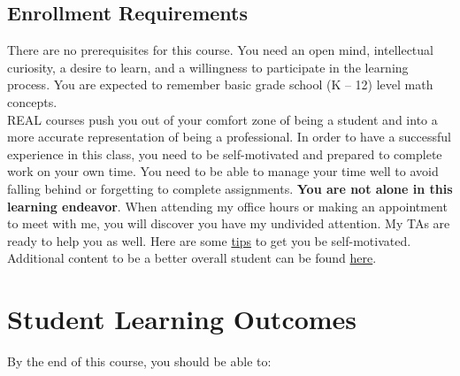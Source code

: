 \documentclass[11pt]{paper}
\begin{document}
\subsection{Enrollment Requirements}
There are no prerequisites for this course.  You need an open mind, intellectual curiosity, a desire to learn, and a willingness to participate in the learning process.  You are expected to remember basic grade school (K – 12) level math concepts.\\

REAL courses push you out of your comfort zone of being a student and into a more accurate representation of being a professional. In order to have a successful experience in this class, you need to be self-motivated and prepared to complete work on your own time. You need to be able to manage your time well to avoid falling behind or forgetting to complete assignments. \textbf{You are not alone in this learning endeavor}. When attending my office hours or making an appointment to meet with me, you will discover you have my undivided attention. My TAs are ready to help you as well. Here are some \href{https://learningcenter.unc.edu/tips-and-tools/motivation/}{tips} to get you be self-motivated. Additional content to be a better overall student can be found \href{https://learningcenter.unc.edu/tips-and-tools/}{here}.

\section{Student Learning Outcomes}
By the end of this course, you should be able to:
\end{document}

